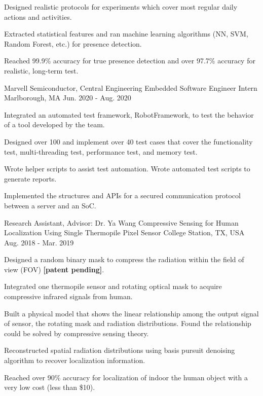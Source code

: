 \begin{cventries}
{\begin{cvitems}
        \item Designed realistic protocols for experiments which cover most regular daily actions and activities. 
        \item Extracted statistical features and ran machine learning algorithms (NN, SVM, Random Forest, etc.) for presence detection.
        \item Reached 99.9\% accuracy for true presence detection and over 97.7\% accuracy for realistic, long-term test. 
      \end{cvitems}
    }
  \cventry
  {Marvell Semiconductor, Central Engineering} 
  {Embedded Software Engineer Intern} %
  {Marlborough, MA} %
  {Jun. 2020 - Aug. 2020} %
  {
    \begin{cvitems} %
      \item Integrated an automated test framework, RobotFramework, to test the behavior of a tool developed by the team.
      \item Designed over 100 and implement over 40 test cases that cover the functionality test, multi-threading test, performance test, and memory test.
      \item Wrote helper scripts to assist test automation. Wrote automated test scripts to generate reports.
      \item Implemented the structures and APIs for a secured communication protocol between a server and an SoC.
    \end{cvitems}
  }

  

  \cventry
    {Research Assistant, Advisor: Dr. Ya Wang} %
    {Compressive Sensing for Human Localization Using Single Thermopile Pixel Sensor} %
    {College Station, TX, USA} %
    {Aug. 2018 - Mar. 2019} %
    {
      \begin{cvitems} %
        \item Designed a random binary mask to compress the radiation within the field of view (FOV) \textbf{[patent pending]}.
        \item Integrated one thermopile sensor and rotating optical mask to acquire compressive infrared signals from human.
        \item Built a physical model that shows the linear relationship among the output signal of sensor, the rotating mask and radiation distributions. Found the relationship could be solved by compressive sensing theory.
        \item Reconstructed spatial radiation distributions using basis pursuit denoising algorithm to recover localization information.
        \item Reached over 90\% accuracy for localization of indoor the human object with a very low cost (less than \$10).
      \end{cvitems}
    }


\end{cventries}
